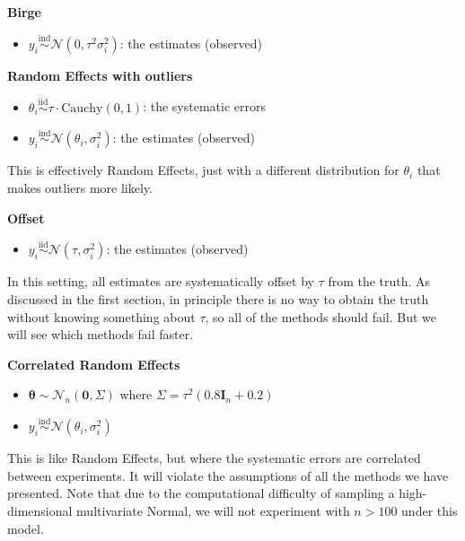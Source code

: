 \documentclass[12pt]{article}
\begin{document}
\textbf{Birge}

\begin{itemize}

\item
  $y_i\overset{\mathrm{ind}}{\sim}\mathcal{N}(0,\tau^2\sigma_i^2)$: the estimates (observed)
\end{itemize}

\textbf{Random Effects with outliers}

\begin{itemize}
\item
  $\theta_i\overset{\mathrm{iid}}{\sim}\tau\cdot \mathrm{Cauchy}(0,1)$: the systematic errors
\item
  $y_i\overset{\mathrm{ind}}{\sim}\mathcal{N}(\theta_i,\sigma_i^2)$: the estimates (observed)
\end{itemize}

This is effectively Random Effects, just with a different distribution for $\theta_i$ that makes outliers more likely.

\textbf{Offset}

\begin{itemize}

\item
  $y_i\overset{\mathrm{iid}}{\sim}\mathcal{N}(\tau,\sigma_i^2)$: the estimates (observed)
\end{itemize}

In this setting, all estimates are systematically offset by $\tau$ from the truth. As discussed in the first section, in principle there is no way to obtain the truth without knowing something about $\tau$, so all of the methods should fail. But we will see which methods fail faster.

\textbf{Correlated Random Effects}

\begin{itemize}
\item
  $\boldsymbol{\theta}\sim \mathcal{N}_n(\mathbf{0},\Sigma)$ where $\Sigma=\tau^2(0.8\mathbf{I}_n+0.2)$
\item
  $y_i\overset{\mathrm{ind}}{\sim}\mathcal{N}(\theta_i,\sigma_i^2)$
\end{itemize}

This is like Random Effects, but where the systematic errors are correlated between experiments. It will violate the assumptions of all the methods we have presented. Note that due to the computational difficulty of sampling a high-dimensional multivariate Normal, we will not experiment with $n>100$ under this model.
\end{document}
